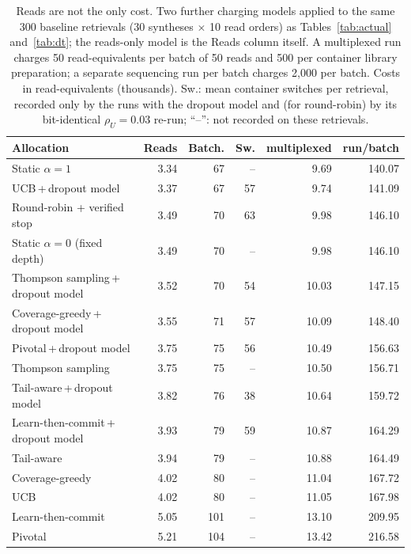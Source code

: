 \begin{table}[!t]
\centering
\caption{Reads are not the only cost.  Two further charging models applied to the same 300 baseline retrievals (30 syntheses $\times$ 10 read orders) as Tables~\ref{tab:actual} and~\ref{tab:dt}; the reads-only model is the Reads column itself.  A multiplexed run charges 50 read-equivalents per batch of 50 reads and 500 per container library preparation; a separate sequencing run per batch charges 2{,}000 per batch.  Costs in read-equivalents (thousands).  Sw.: mean container switches per retrieval, recorded only by the runs with the dropout model and (for round-robin) by its bit-identical $\rho_U{=}0.03$ re-run; ``--'': not recorded on these retrievals.}
\label{tab:r4cost}
\scriptsize
\setlength{\tabcolsep}{3pt}
\begin{tabular}{@{}p{30mm}rrrrr@{}}
\toprule
Allocation & Reads & Batch. & Sw. & multiplexed & run/batch \\
\midrule
Static $\alpha{=}1$ & 3.34 & 67 & -- & 9.69 & 140.07 \\
UCB\,+\,dropout model & 3.37 & 67 & 57 & 9.74 & 141.09 \\
Round-robin + verified stop & 3.49 & 70 & 63 & 9.98 & 146.10 \\
Static $\alpha{=}0$ (fixed depth) & 3.49 & 70 & -- & 9.98 & 146.10 \\
Thompson sampling\,+\,dropout model & 3.52 & 70 & 54 & 10.03 & 147.15 \\
Coverage-greedy\,+\,dropout model & 3.55 & 71 & 57 & 10.09 & 148.40 \\
Pivotal\,+\,dropout model & 3.75 & 75 & 56 & 10.49 & 156.63 \\
Thompson sampling & 3.75 & 75 & -- & 10.50 & 156.71 \\
Tail-aware\,+\,dropout model & 3.82 & 76 & 38 & 10.64 & 159.72 \\
Learn-then-commit\,+\,dropout model & 3.93 & 79 & 59 & 10.87 & 164.29 \\
Tail-aware & 3.94 & 79 & -- & 10.88 & 164.49 \\
Coverage-greedy & 4.02 & 80 & -- & 11.04 & 167.72 \\
UCB & 4.02 & 80 & -- & 11.05 & 167.98 \\
Learn-then-commit & 5.05 & 101 & -- & 13.10 & 209.95 \\
Pivotal & 5.21 & 104 & -- & 13.42 & 216.58 \\
\bottomrule
\end{tabular}
\end{table}
